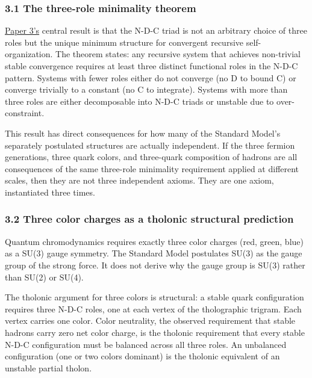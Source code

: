 \documentclass[
  11pt,
  letterpaper,
]{article}
\begin{document}
\subsubsection{3.1 The three-role minimality
theorem}\label{the-three-role-minimality-theorem}

\href{https://github.com/baardev/truevalue/blob/main/docnav/Research/papers/3_minimal-recursive-triadic-framework/3_minimal-recursive-triadic-framework.pdf}{Paper
3's} central result is that the N-D-C triad is not an arbitrary choice
of three roles but the unique minimum structure for convergent recursive
self-organization. The theorem states: any recursive system that
achieves non-trivial stable convergence requires at least three distinct
functional roles in the N-D-C pattern. Systems with fewer roles either
do not converge (no D to bound C) or converge trivially to a constant
(no C to integrate). Systems with more than three roles are either
decomposable into N-D-C triads or unstable due to over-constraint.

This result has direct consequences for how many of the Standard Model's
separately postulated structures are actually independent. If the three
fermion generations, three quark colors, and three-quark composition of
hadrons are all consequences of the same three-role minimality
requirement applied at different scales, then they are not three
independent axioms. They are one axiom, instantiated three times.

\subsubsection{3.2 Three color charges as a tholonic structural
prediction}\label{three-color-charges-as-a-tholonic-structural-prediction}

Quantum chromodynamics requires exactly three color charges (red, green,
blue) as a SU(3) gauge symmetry. The Standard Model postulates SU(3) as
the gauge group of the strong force. It does not derive why the gauge
group is SU(3) rather than SU(2) or SU(4).

The tholonic argument for three colors is structural: a stable quark
configuration requires three N-D-C roles, one at each vertex of the
tholographic trigram. Each vertex carries one color. Color neutrality,
the observed requirement that stable hadrons carry zero net color
charge, is the tholonic requirement that every stable N-D-C
configuration must be balanced across all three roles. An unbalanced
configuration (one or two colors dominant) is the tholonic equivalent of
an unstable partial tholon.
\end{document}

